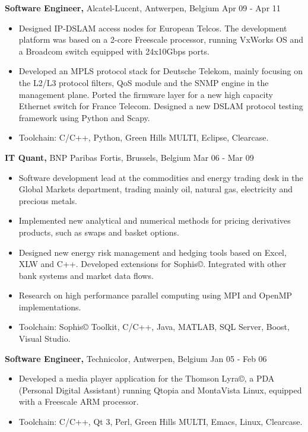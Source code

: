 \documentclass[margin]{res}
\begin{document}
\begin{resume}
{\bf Software Engineer,} Alcatel-Lucent, Antwerpen, Belgium \hfill  Apr 09 - Apr 11
\begin{itemize} \itemsep -2pt %
\item Designed IP-DSLAM access nodes for European Telcos. The development platform was based on a 2-core Freescale processor, running VxWorks OS and a Broadcom switch equipped with 24x10Gbps ports.
\item Developed an MPLS protocol stack for Deutsche Telekom, mainly focusing on the L2/L3 protocol filters, QoS module and the SNMP engine in the management plane. Ported the firmware layer for a new high capacity Ethernet switch for France Telecom. Designed a new DSLAM protocol testing framework using Python and Scapy.
\item Toolchain: C/C++, Python, Green Hills MULTI, Eclipse, Clearcase.
\end{itemize}

{\bf IT Quant,} BNP Paribas Fortis, Brussels, Belgium \hfill  Mar 06 - Mar 09
\begin{itemize} \itemsep -2pt %
\item Software development lead at the commodities and energy trading desk in the Global Markets department, trading mainly oil, natural gas, electricity and precious metals.
\item Implemented new analytical and numerical methods for pricing derivatives products, such as swaps and basket options.
\item Designed new energy risk management and hedging tools based on Excel, XLW and C++. Developed extensions for Sophis©. Integrated with other bank systems and market data flows.
\item Research on high performance parallel computing using MPI and OpenMP implementations.
\item Toolchain: Sophis© Toolkit, C/C++, Java, MATLAB, SQL Server, Boost, Visual Studio.
\end{itemize}

{\bf Software Engineer,} Technicolor, Antwerpen, Belgium \hfill  Jan 05 - Feb 06
\begin{itemize} \itemsep -2pt %
\item Developed a media player application for the Thomson Lyra©, a PDA (Personal Digital Assistant) running Qtopia and MontaVista Linux, equipped with a Freescale ARM processor.
\item Toolchain: C/C++, Qt 3, Perl, Green Hills MULTI, Emacs, Linux, Clearcase.
\end{itemize}


\end{resume}
\end{document}
